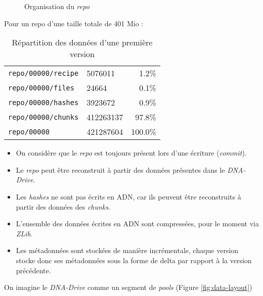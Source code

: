 \documentclass[a4paper,twocolumn]{article}
\begin{document}
\begin{figure}
\caption{Organisation du \emph{repo}}
\label{fig:repo-dir-tree}
\end{figure}

Pour un repo d'une taille totale de 401 Mio :

\begin{table}
\begin{tabular}{l l r}
\verb|repo/00000/recipe| &   5076011 &   1.2\% \\
\verb|repo/00000/files| &      24664 &   0.1\% \\
\verb|repo/00000/hashes| &   3923672 &   0.9\% \\
\verb|repo/00000/chunks| & 412263137 &  97.8\% \\
\verb|repo/00000| &        421287604 & 100.0\% \\
\end{tabular}
\caption{Répartition des données d'une première version}
\label{fig:repo-data-distribution}
\end{table}

\begin{itemize}
\item
  On considère que le \emph{repo} est toujours présent lors d'une
  écriture (\emph{commit}).
\item
  Le \emph{repo} peut être reconstruit à partir des données présentes
  dans le \emph{DNA-Drive}.
\item
  Les \emph{hashes} ne sont pas écrits en ADN, car ils peuvent être
  reconstruits à partir des données des \emph{chunks}.
\item
  L'ensemble des données écrites en ADN sont compressées, pour le moment
  via \emph{ZLib}.
\item
  Les métadonnées sont stockées de manière incrémentale, chaque version
  stocke donc ses métadonnées sous la forme de delta par rapport à la
  version précédente.
\end{itemize}

On imagine le \emph{DNA-Drive} comme un segment de \emph{pools} (Figure \ref{fig:data-layout})
\end{document}
